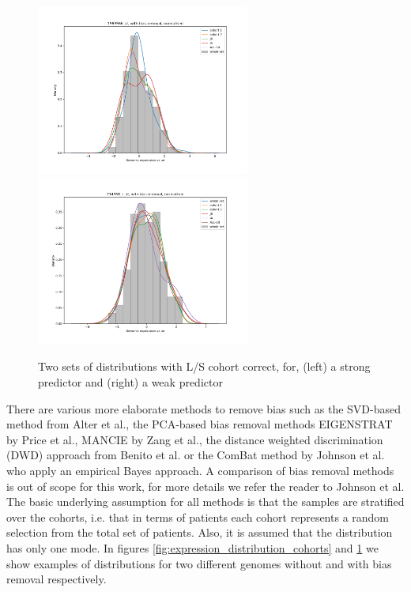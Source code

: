 \documentclass[a4paper,10pt]{article}
\begin{document}
%
\begin{figure}[htp!]
\centering
\includegraphics[width=7cm]{images/strong_genome_distribution_withCorrection_standardNormalisation}
\includegraphics[width=7cm]{images/weak_genome_distribution_withCorrection_standardNormalisation}
\caption{Two sets of distributions with L/S cohort correct, for, (left) a strong predictor and (right) a weak predictor}
\label{fig:expression_distribution_cohorts_withBiasCorrection}
\end{figure}
%
There are various more elaborate methods to remove bias such as the SVD-based method from Alter et al.\cite{Alter2000}, the 
PCA-based bias removal methods EIGENSTRAT by Price et al.\cite{Price2006}, MANCIE by Zang et al.\cite{Zang2016}, the distance weighted discrimination (DWD)
approach from Benito et al.\cite{Benito2005} or the ComBat method by Johnson et al.\cite{Johnson2007} who apply an empirical Bayes approach. 
A comparison of bias removal methods is out of scope for this work, for more details we refer the reader to Johnson et al\cite{Johnson2007}.
The basic underlying assumption for all methods is that the samples are stratified over the cohorts, i.e. that in terms
of patients each cohort represents a random selection from the total set of patients. Also, it is assumed that 
the distribution has only one mode. In figures \ref{fig:expression_distribution_cohorts} and \ref{fig:expression_distribution_cohorts_withBiasCorrection}
we show examples of distributions for two different genomes without and with bias removal respectively.
\end{document}
